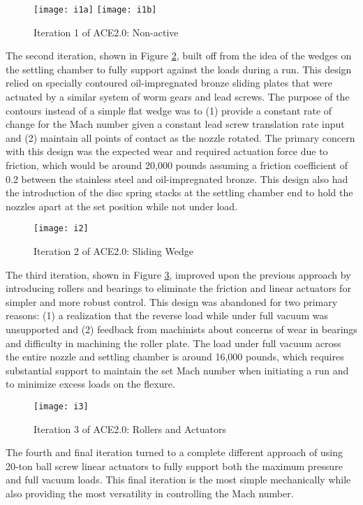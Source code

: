 \begin{figure}[ht!]
    \centering
    \texttt{[image: i1a]}
    \texttt{[image: i1b]}
    \caption{Iteration 1 of ACE2.0: Non-active}
    \label{fig:i1}
\end{figure}

The second iteration, shown in Figure \ref{fig:i2}, built off from the idea of the wedges on the settling chamber to fully support against the loads during a run. This design relied on specially contoured oil-impregnated bronze sliding plates that were actuated by a similar system of worm gears and lead screws. The purpose of the contours instead of a simple flat wedge was to (1) provide a constant rate of change for the Mach number given a constant lead screw translation rate input and (2) maintain all points of contact as the nozzle rotated. The primary concern with this design was the expected wear and required actuation force due to friction, which would be around 20,000 pounds assuming a friction coefficient of 0.2 between the stainless steel and oil-impregnated bronze. This design also had the introduction of the disc spring stacks at the settling chamber end to hold the nozzles apart at the set position while not under load. 

\begin{figure}[ht!]
    \centering
    \texttt{[image: i2]}
    \caption{Iteration 2 of ACE2.0: Sliding Wedge}
    \label{fig:i2}
\end{figure}

The third iteration, shown in Figure \ref{fig:i3}, improved upon the previous approach by introducing rollers and bearings to eliminate the friction and linear actuators for simpler and more robust control. This design was abandoned for two primary reasons: (1) a realization that the reverse load while under full vacuum was unsupported and (2) feedback from machinists about concerns of wear in bearings and difficulty in machining the roller plate. The load under full vacuum across the entire nozzle and settling chamber is around 16,000 pounds, which requires substantial support to maintain the set Mach number when initiating a run and to minimize excess loads on the flexure.

\begin{figure}[ht!]
    \centering
    \texttt{[image: i3]}
    \caption{Iteration 3 of ACE2.0: Rollers and Actuators}
    \label{fig:i3}
\end{figure}

The fourth and final iteration turned to a complete different approach of using 20-ton ball screw linear actuators to fully support both the maximum pressure and full vacuum loads. This final iteration is the most simple mechanically while also providing the most versatility in controlling the Mach number.

